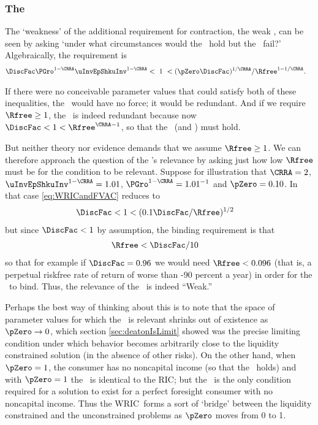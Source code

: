 \documentclass[BufferStockTheory]{subfiles}
\begin{document}
\subsubsection{The \WRIC}

The `weakness' of the additional requirement for contraction, the
weak \RIC, can be seen by asking `under what circumstances
would the \FVAC~hold but the \WRIC~fail?'
Algebraically, the requirement is
\begin{align}
  \DiscFac \PGro^{1-\CRRA}\uInvEpShkuInv^{1-\CRRA} & < ~ 1 ~ <  (\pZero \DiscFac)^{1/\CRRA}/\Rfree^{1-1/\CRRA}. \label{eq:WRICandFVAC}
\end{align}

If there were no conceivable parameter values that could satisfy both
of these inequalities, the \WRIC~would have no force; it would be
redundant.  And if we require $\Rfree \geq 1$, the \WRIC~is indeed
redundant because now $\DiscFac <1<\Rfree^{\CRRA-1}$, so that the \RIC~(and \WRIC) must hold.

But neither theory nor evidence demands that we assume $\Rfree \geq
1$.  We can therefore approach the question of the \WRIC's relevance by
asking just how low $\Rfree$ must be for the condition to be relevant.
Suppose for illustration that $\CRRA=2$, $\uInvEpShkuInv^{1-\CRRA}=1.01$,
$\PGro^{1-\CRRA}=1.01^{-1}$ and $\pZero = 0.10$.  In that case
\eqref{eq:WRICandFVAC} reduces to
\begin{align}
  \DiscFac  & < 1 < (0.1 \DiscFac/\Rfree)^{1/2} \notag
\end{align}
but since $\DiscFac < 1$ by assumption, the binding requirement is that
\begin{align}
  \Rfree  & < \DiscFac/10 \notag
\end{align}
so that for example if $\DiscFac=0.96$ we would need $\Rfree < 0.096$
(that is, a perpetual riskfree rate of return of worse than -90
percent a year) in order for the \WRIC~to bind.
Thus, the relevance of the \WRIC~is indeed ``Weak.''

Perhaps the best way of thinking about this is to note that the space
of parameter values for which the \WRIC~is relevant shrinks out of
existence as $\pZero \rightarrow 0$, which section
\ref{sec:deatonIsLimit} showed was the precise limiting condition
under which behavior becomes arbitrarily close to the liquidity
constrained solution (in the absence of other risks).  On the other
hand, when $\pZero = 1$, the consumer has no noncapital income (so
that the \FHWC~holds) and with $\pZero=1$ the \WRIC~is identical to the
RIC; but the \RIC~is
the only condition required for a solution to exist
for a perfect foresight consumer with no noncapital income.  Thus the
WRIC~forms a sort of `bridge' between the liquidity constrained and
the unconstrained problems as $\pZero$ moves from 0 to 1.
\end{document}

